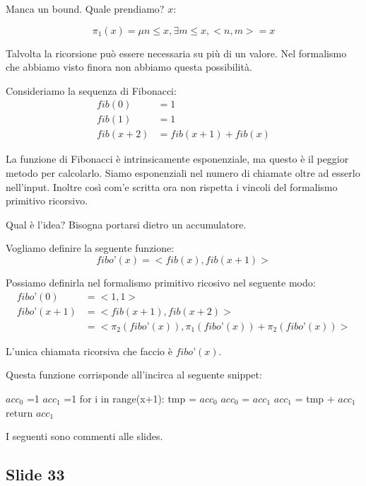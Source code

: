 Manca un bound. Quale prendiamo? $x$:

\begin{equation*}
    \pi_{1}(x) = \mu n \leq x, \exists m \leq x, <n,m> = x
\end{equation*}

Talvolta la ricorsione può essere necessaria su più di un valore. Nel formalismo che abbiamo visto
finora non abbiamo questa possibilità.

Consideriamo la sequenza di Fibonacci:
\begin{align*}
    \textit{fib}(0) &= 1 \\
    \textit{fib}(1) &= 1 \\
    \textit{fib}(x+2) &= \textit{fib}(x+1) + \textit{fib}(x)
\end{align*}

La funzione di Fibonacci è intrinsicamente esponenziale, ma questo è il peggior metodo per
calcolarlo. Siamo esponenziali nel numero di chiamate oltre ad esserlo nell'input. Inoltre così
com'e scritta ora non rispetta i vincoli del formalismo primitivo ricorsivo.

Qual è l'idea? Bisogna portarsi dietro un accumulatore.

Vogliamo definire la seguente funzione:
\begin{equation*}
    \textit{fibo'}(x) = <\textit{fib}(x),\textit{fib}(x+1)>
\end{equation*}

Possiamo definirla nel formalismo primitivo ricosivo nel seguente modo:
\begin{align*}
    \textit{fibo'}(0) &= <1,1> \\
    \textit{fibo'}(x+1) &= <\textit{fib}(x+1),\textit{fib}(x+2)> \\
    &= <\pi_{2}(\textit{fibo'}(x)),\pi_{1}(\textit{fibo'}(x)) + \pi_{2}(\textit{fibo'}(x))>
\end{align*}

L'unica chiamata ricorsiva che faccio è $\textit{fibo'}(x)$.

Questa funzione corrisponde all'incirca al seguente snippet:
 
\begin{python}
$acc_{0}$ =1
$acc_{1}$ =1
for i in range(x+1):
    tmp = $acc_{0}$
    $acc_{0}$ = $acc_{1}$
    $acc_{1}$ = tmp + $acc_{1}$
return $acc_{1}$
\end{python}

I seguenti sono commenti alle slides.

\subsection{Slide 33}

